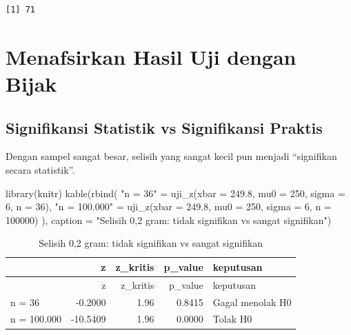 \documentclass[
  indonesian,
  letterpaper,
]{book}
\newenvironment{Shaded}{\begin{snugshade}}{\end{snugshade}}
\newcommand{\AttributeTok}[1]{\textcolor[rgb]{0.40,0.45,0.13}{#1}}
\newcommand{\DecValTok}[1]{\textcolor[rgb]{0.68,0.00,0.00}{#1}}
\newcommand{\FloatTok}[1]{\textcolor[rgb]{0.68,0.00,0.00}{#1}}
\newcommand{\FunctionTok}[1]{\textcolor[rgb]{0.28,0.35,0.67}{#1}}
\newcommand{\NormalTok}[1]{\textcolor[rgb]{0.00,0.23,0.31}{#1}}
\newcommand{\OtherTok}[1]{\textcolor[rgb]{0.00,0.23,0.31}{#1}}
\newcommand{\StringTok}[1]{\textcolor[rgb]{0.13,0.47,0.30}{#1}}
\begin{document}
\begin{verbatim}
[1] 71
\end{verbatim}


\chapter{Menafsirkan Hasil Uji dengan
Bijak}\label{menafsirkan-hasil-uji-dengan-bijak}

\section{Signifikansi Statistik vs Signifikansi
Praktis}\label{signifikansi-statistik-vs-signifikansi-praktis}

Dengan sampel sangat besar, selisih yang sangat kecil pun menjadi
``signifikan secara statistik''.

\begin{Shaded}
\begin{Highlighting}[]
\FunctionTok{library}\NormalTok{(knitr)}
\FunctionTok{kable}\NormalTok{(}\FunctionTok{rbind}\NormalTok{(}
  \StringTok{"n = 36"}      \OtherTok{=} \FunctionTok{uji\_z}\NormalTok{(}\AttributeTok{xbar =} \FloatTok{249.8}\NormalTok{, }\AttributeTok{mu0 =} \DecValTok{250}\NormalTok{, }\AttributeTok{sigma =} \DecValTok{6}\NormalTok{, }\AttributeTok{n =} \DecValTok{36}\NormalTok{),}
  \StringTok{"n = 100.000"} \OtherTok{=} \FunctionTok{uji\_z}\NormalTok{(}\AttributeTok{xbar =} \FloatTok{249.8}\NormalTok{, }\AttributeTok{mu0 =} \DecValTok{250}\NormalTok{, }\AttributeTok{sigma =} \DecValTok{6}\NormalTok{, }\AttributeTok{n =} \DecValTok{100000}\NormalTok{)}
\NormalTok{), }\AttributeTok{caption =} \StringTok{"Selisih 0,2 gram: tidak signifikan vs sangat signifikan"}\NormalTok{)}
\end{Highlighting}
\end{Shaded}

\begin{longtable}[]{@{}lrrrl@{}}
\caption{Selisih 0,2 gram: tidak signifikan vs sangat
signifikan}\tabularnewline
\toprule\noalign{}
& z & z\_kritis & p\_value & keputusan \\
\midrule\noalign{}
\endfirsthead
\toprule\noalign{}
& z & z\_kritis & p\_value & keputusan \\
\midrule\noalign{}
\endhead
\bottomrule\noalign{}
\endlastfoot
n = 36 & -0.2000 & 1.96 & 0.8415 & Gagal menolak H0 \\
n = 100.000 & -10.5409 & 1.96 & 0.0000 & Tolak H0 \\
\end{longtable}
\end{document}
